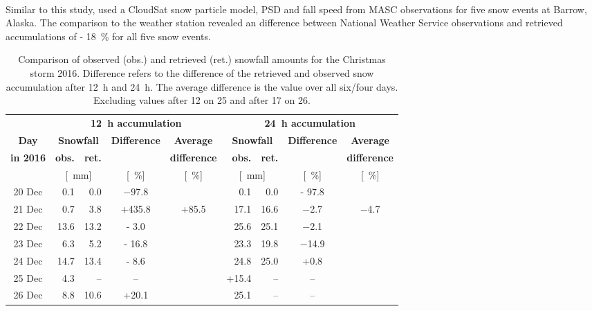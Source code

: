 \\
Similar to this study, \citet{cooper_variational_2017} used a CloudSat snow particle model, PSD and fall speed from MASC observations for five snow events at Barrow, Alaska. The comparison to the weather station revealed an difference between National Weather Service observations and retrieved accumulations of \SI{- 18}{\percent} for all five snow events.
\begin{table}[t!]
	\begin{center}
		\caption{Comparison of observed (obs.) and retrieved (ret.) snowfall amounts for the Christmas storm 2016. Difference refers to the difference of the retrieved and observed snow accumulation after \SI{12}{\hour} and \SI{24}{\hour}. The average difference is the value over all six/four days. Excluding values after \SI{12}{\UTC} on \SI{25}{\dec} and after \SI{17}{\UTC} on \SI{26}{\dec}.}\label{tab:res:ret_error}
		\begin{tabular}{c||r|r|c|c||r|r|c|c}
			\hline \hline
			& \multicolumn{4}{c||}{\textbf{\SI{12}{\hour} accumulation}} & \multicolumn{4}{c}{\textbf{\SI{24}{\hour} accumulation}}    \\ \cline{2-9}
			\textbf{Day} & \multicolumn{2}{c|}{\textbf{Snowfall}} & \textbf{Difference} & \textbf{Average} &  \multicolumn{2}{c|}{\textbf{Snowfall}} & \textbf{Difference} & \textbf{Average}  \\\cline{2-3} \cline{6-7}
			\textbf{in 2016} & \textbf{obs.} & \textbf{ret.} & & \textbf{difference} & \textbf{obs.} & \textbf{ret.} & & \textbf{difference} \\\cline{2-9}
			& \multicolumn{2}{c|}{[\SI{}{\mm}]} & [\SI{}{\percent}] & [\SI{}{\percent}] & \multicolumn{2}{c|}{[\SI{}{\mm}]} & [\SI{}{\percent}] & [\SI{}{\percent}] \\ \hline\hline
			\num{20} Dec & \num{0.1} &\num{0.0} & \num{-97.8} & & \num{0.1} & \num{0.0} & \num{- 97.8} &  \\\cline{1-9}
			\num{21} Dec & \num{0.7} & \num{3.8} & +\num{435.8} & \multirow{6}{*}{+\num{85.5}} & \num{17.1} & \num{16.6} & \num{-2.7} & \multirow{4}{*}{\num{-4.7}}   \\\cline{1-4}\cline{6-8}
			\num{22} Dec & \num{13.6}& \num{13.2} & \num{- 3.0} & & \num{25.6} &\num{25.1} & \num{-2.1} &   \\\cline{1-4}\cline{6-8}
			\num{23} Dec & \num{6.3} &\num{5.2} & \num{- 16.8} & & \num{23.3}& \num{19.8} & \num{-14.9} &   \\\cline{1-4}\cline{6-8}
			\num{24} Dec & \num{14.7} & \num{13.4} & \num{- 8.6} && \num{24.8} & \num{25.0} & +\num{0.8} &   \\\cline{1-4}\cline{6-9}
			\num{25} Dec &  \num{4.3} & -- & -- & & +\num{15.4} & -- & -- & \\\cline{1-4}\cline{6-9}
			\num{26} Dec & \num{8.8} & \num{10.6} & +\num{20.1} &  &  \num{25.1} &-- & -- &  \\\hline\hline
		\end{tabular}
	\end{center}
\end{table}
